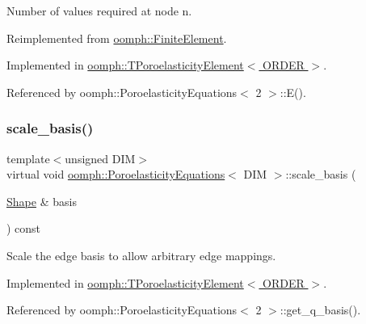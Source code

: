 Number of values required at node n. 



Reimplemented from \hyperlink{classoomph_1_1FiniteElement_a56610c60d5bc2d7c27407a1455471b1a}{oomph\+::\+Finite\+Element}.



Implemented in \hyperlink{classoomph_1_1TPoroelasticityElement_a03e370454fbf25ba5d57c0e9e5d95062}{oomph\+::\+T\+Poroelasticity\+Element$<$ O\+R\+D\+E\+R $>$}.



Referenced by oomph\+::\+Poroelasticity\+Equations$<$ 2 $>$\+::\+E().

\mbox{\label{classoomph_1_1PoroelasticityEquations_a92c3f4965f318a98eb7c6ac06de7aa4d}} 
\subsubsection{\texorpdfstring{scale\+\_\+basis()}{scale\_basis()}}
{\footnotesize\ttfamily template$<$unsigned D\+IM$>$ \\
virtual void \hyperlink{classoomph_1_1PoroelasticityEquations}{oomph\+::\+Poroelasticity\+Equations}$<$ D\+IM $>$\+::scale\+\_\+basis (\begin{DoxyParamCaption}\item[{\hyperlink{classoomph_1_1Shape}{Shape} \&}]{basis }\end{DoxyParamCaption}) const\hspace{0.3cm}{\ttfamily [pure virtual]}}



Scale the edge basis to allow arbitrary edge mappings. 



Implemented in \hyperlink{classoomph_1_1TPoroelasticityElement_a46bdd198a1675b743674964c79396db1}{oomph\+::\+T\+Poroelasticity\+Element$<$ O\+R\+D\+E\+R $>$}.



Referenced by oomph\+::\+Poroelasticity\+Equations$<$ 2 $>$\+::get\+\_\+q\+\_\+basis().

\mbox{\label{classoomph_1_1PoroelasticityEquations_ad655780a10fff85d3d0b87738decfb4d}} 
